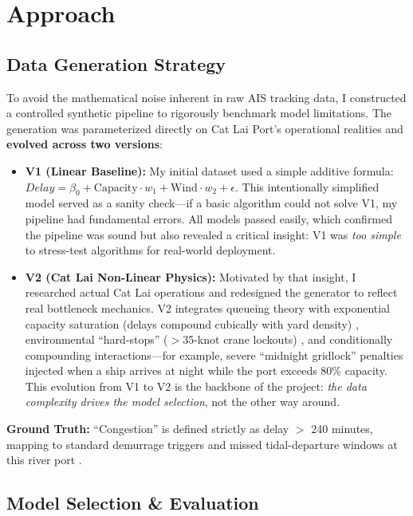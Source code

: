 \documentclass[11pt, a4paper]{article}
\begin{document}
\section{Approach}

\subsection{Data Generation Strategy}

To avoid the mathematical noise inherent in raw AIS tracking data, I constructed a controlled synthetic pipeline to rigorously benchmark model limitations. The generation was parameterized directly on Cat Lai Port's operational realities and \textbf{evolved across two versions}:

\begin{itemize}[nosep, leftmargin=1.5em]
    \item \textbf{V1 (Linear Baseline):} My initial dataset used a simple additive formula: $Delay = \beta_0 + \text{Capacity} \cdot w_1 + \text{Wind} \cdot w_2 + \epsilon$. This intentionally simplified model served as a sanity check---if a basic algorithm could not solve V1, my pipeline had fundamental errors. All models passed easily, which confirmed the pipeline was sound but also revealed a critical insight: V1 was \textit{too simple} to stress-test algorithms for real-world deployment.
    
    \item \textbf{V2 (Cat Lai Non-Linear Physics):} Motivated by that insight, I researched actual Cat Lai operations \cite{saigon_newport} and redesigned the generator to reflect real bottleneck mechanics. V2 integrates queueing theory with exponential capacity saturation (delays compound cubically with yard density) \cite{mm1_queue}, environmental ``hard-stops'' ($>$35-knot crane lockouts) \cite{pema_wind}, and conditionally compounding interactions---for example, severe ``midnight gridlock'' penalties \cite{vietnamnet_catlai} injected when a ship arrives at night while the port exceeds 80\% capacity. This evolution from V1 to V2 is the backbone of the project: \textit{the data complexity drives the model selection}, not the other way around.
\end{itemize}

\textbf{Ground Truth:} ``Congestion'' is defined strictly as delay $>$ 240 minutes, mapping to standard demurrage triggers and missed tidal-departure windows at this river port \cite{saigon_newport}.

\subsection{Model Selection \& Evaluation}
\end{document}
